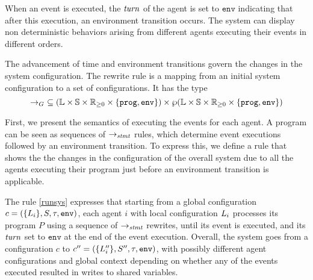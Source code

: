 

When an event is executed, the $\mathit{turn}$ of the agent is set to $\mathtt{env}$ indicating that after this execution, an environment transition occurs. The system can display non deterministic behaviors arising from different agents executing their events in different orders.


The advancement of time and environment transitions govern the changes in the system configuration.
The rewrite rule is a mapping from an initial system configuration to a set of configurations.
It has the type
$$\rightarrow_G\ \subseteq (\pwl\times \pws \times \nnreals \times \{\mathtt{prog,env}\}) \times \wp(\pwl\times\pws \times \nnreals\times \{\mathtt{prog,env}\}) $$

First, we present the semantics of executing the events for each agent.
A \lgname program can be seen as sequences of $\rightarrow_\mathit{stmt}$ rules, which determine event executions followed by an environment transition.
To express this, we define a rule that shows the the changes in the configuration of the overall system due to all the agents executing their program just before an environment transition is applicable.

The rule \ref{runsys} expresses that starting from a global configuration $c = (\{L_{i}\}, S, \tau, \mathtt{env})$,
 each agent $i$ with local configuration $L_{i}$ processes its program $P$ using a sequence of $\rightarrow_\mathit{stmt}$ rewrites, until its event is executed,
 and its $\mathit{turn}$ set to $\mathtt{env}$ at the end of the event execution.
 Overall, the system goes from a configuration $c$ to $c^{\prime\prime}= (\{L_{i}^{\prime\prime}\}, S^{\prime\prime}, \tau, \mathtt{env})$,
 with possibly different agent configurations and global context depending on whether any of the events executed resulted in writes to shared variables.



